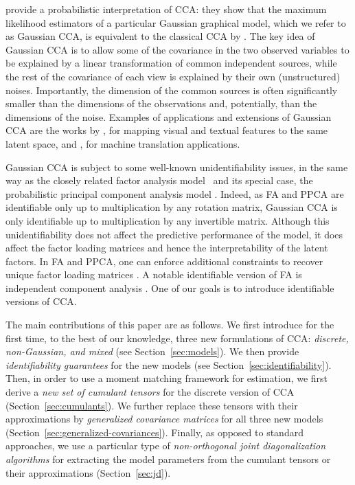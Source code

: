 \documentclass{article}
\begin{document}
\citet{BacJor2005} provide a probabilistic interpretation of CCA: they show that the maximum likelihood estimators of a particular Gaussian graphical model, which we refer to as Gaussian CCA, is equivalent to the classical CCA by \citet{Hot1936}. 
The key idea of Gaussian CCA is to allow some of the covariance in the two observed variables to be  explained by a linear transformation of common independent sources, while the rest of the covariance of each view is explained by their own (unstructured) noises. Importantly, the dimension of the common sources is often significantly smaller than the dimensions of the observations and, potentially, than the dimensions of the noise.
Examples of applications and extensions of Gaussian CCA are the works by \citet{SocFei2010}, for mapping visual and textual features to the same latent space, and \citet{HagEtAl2008}, for  machine translation applications. 

Gaussian CCA is subject to some well-known unidentifiability issues, in the same way as the closely related factor analysis model~\citep[FA;][]{Bar1987,Bas1994} and its special case, the probabilistic principal component analysis model \citep[PPCA;][]{TipBis1999,Row1998}.
Indeed, as FA and PPCA are identifiable only up to multiplication by any rotation matrix, Gaussian CCA is only identifiable up to multiplication by any invertible matrix. 
Although this unidentifiability does not affect the predictive performance of the model, it does affect the factor loading matrices and hence the interpretability of the latent factors. In FA and PPCA, one can enforce additional constraints to recover unique factor loading matrices \citep[see, e.g.,][]{Mur2012}.
A notable identifiable version of FA is independent component analysis \citep[ICA;][]{Jut1987,JutHer1991,ComJut2010}.
One of our goals is to introduce identifiable versions of  CCA.

The main contributions of this paper are as follows. We first introduce  for the first time, to the best of our knowledge, three new formulations of CCA: \emph{discrete, non-Gaussian, and mixed}  (see Section~\ref{sec:models}). We then provide \emph{ identifiability guarantees} for the new models (see Section~\ref{sec:identifiability}). Then, in order to use a moment matching framework for estimation, we first derive a \emph{new set of cumulant tensors} for the discrete version of CCA (Section~\ref{sec:cumulants}). We further replace these tensors with their approximations by \emph{generalized covariance matrices} for all three new models (Section~\ref{sec:generalized-covariances}). Finally, as opposed to standard approaches, we use a particular type of \emph{non-orthogonal joint diagonalization algorithms} for extracting the model parameters from the cumulant tensors or their approximations (Section~\ref{sec:jd}).
\end{document}
